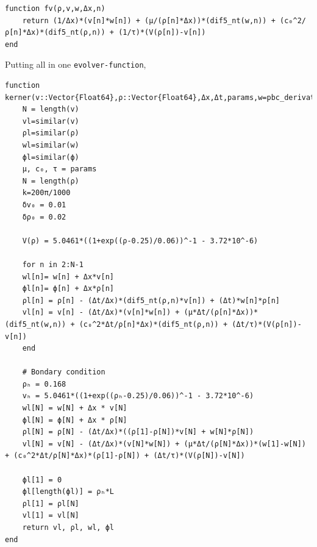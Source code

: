\documentclass[11pt]{article}
\begin{document}
\begin{enumerate}
\begin{verbatim}
function fv(ρ,v,w,Δx,n)
    return (1/Δx)*(v[n]*w[n]) + (μ/(ρ[n]*Δx))*(dif5_nt(w,n)) + (c₀^2/ρ[n]*Δx)*(dif5_nt(ρ,n)) + (1/τ)*(V(ρ[n])-v[n])
end
\end{verbatim}


Putting all in one \texttt{evolver-function},
\begin{verbatim}
function kerner(v::Vector{Float64},ρ::Vector{Float64},Δx,Δt,params,w=pbc_derivative(v,Δx),ϕ=pbc_derivative(ρ,Δx))
    N = length(v)
    vl=similar(v)
    ρl=similar(ρ)
    wl=similar(w)
    ϕl=similar(ϕ)
    μ, c₀, τ = params
    N = length(ρ)
    k=200π/1000
    δv₀ = 0.01
    δρ₀ = 0.02

    V(ρ) = 5.0461*((1+exp((ρ-0.25)/0.06))^-1 - 3.72*10^-6)

    for n in 2:N-1
	wl[n]= w[n] + Δx*v[n]
	ϕl[n]= ϕ[n] + Δx*ρ[n]
	ρl[n] = ρ[n] - (Δt/Δx)*(dif5_nt(ρ,n)*v[n]) + (Δt)*w[n]*ρ[n]
	vl[n] = v[n] - (Δt/Δx)*(v[n]*w[n]) + (μ*Δt/(ρ[n]*Δx))*(dif5_nt(w,n)) + (c₀^2*Δt/ρ[n]*Δx)*(dif5_nt(ρ,n)) + (Δt/τ)*(V(ρ[n])-v[n])
    end

    # Bondary condition
    ρₕ = 0.168
    vₕ = 5.0461*((1+exp((ρₕ-0.25)/0.06))^-1 - 3.72*10^-6)
    wl[N] = w[N] + Δx * v[N]
    ϕl[N] = ϕ[N] + Δx * ρ[N]
    ρl[N] = ρ[N] - (Δt/Δx)*((ρ[1]-ρ[N])*v[N] + w[N]*ρ[N])
    vl[N] = v[N] - (Δt/Δx)*(v[N]*w[N]) + (μ*Δt/(ρ[N]*Δx))*(w[1]-w[N]) + (c₀^2*Δt/ρ[N]*Δx)*(ρ[1]-ρ[N]) + (Δt/τ)*(V(ρ[N])-v[N])

    ϕl[1] = 0
    ϕl[length(ϕl)] = ρₕ*L
    ρl[1] = ρl[N]
    vl[1] = vl[N]
    return vl, ρl, wl, ϕl
end
\end{verbatim}
\end{enumerate}
\end{document}
